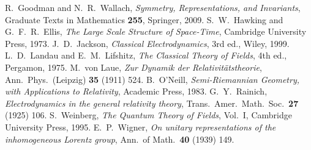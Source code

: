  R.~Goodman and N.~R.~Wallach, \emph{Symmetry, Representations, and Invariants}, Graduate Texts in Mathematics \textbf{255}, Springer, 2009.
 S.~W.~Hawking and G.~F.~R.~Ellis, \emph{The Large Scale Structure of Space-Time}, Cambridge University Press, 1973.
 J.~D.~Jackson, \emph{Classical Electrodynamics}, 3rd ed., Wiley, 1999.
 L.~D.~Landau and E.~M.~Lifshitz, \emph{The Classical Theory of Fields}, 4th ed., Pergamon, 1975.
 M.~von Laue, \emph{Zur Dynamik der Relativit\"atstheorie}, Ann.~Phys.~(Leipzig) \textbf{35} (1911) 524.
 B.~O'Neill, \emph{Semi-Riemannian Geometry, with Applications to Relativity}, Academic Press, 1983.
 G.~Y.~Rainich, \emph{Electrodynamics in the general relativity theory}, Trans.~Amer.~Math.~Soc.~\textbf{27} (1925) 106.
 S.~Weinberg, \emph{The Quantum Theory of Fields}, Vol.~I, Cambridge University Press, 1995.
 E.~P.~Wigner, \emph{On unitary representations of the inhomogeneous Lorentz group}, Ann.~of Math.~\textbf{40} (1939) 149.
